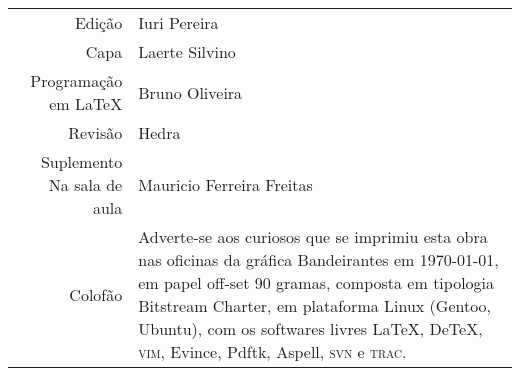 
\newcommand{\putline}[2]{#1 & #2\\}

%
\ifodd\thepage\paginabranca\else\clearpage\fi
\pagebreak
\thispagestyle{empty}

\noindent\begin{tabular}{rp{}}\small
    \putline{Edição}{Iuri Pereira}
		\putline{Capa}{Laerte Silvino}
		\putline{Programação em \LaTeX}{Bruno Oliveira}
		\putline{Revisão}{Hedra}
		\putline{Suplemento Na sala de aula}{Mauricio Ferreira Freitas}
		\putline{Colofão}{Adverte-se aos curiosos que se
			imprimiu esta obra nas oficinas da gráfica
			Bandeirantes em \today, em papel 
			\mbox{off-set} 90 gramas,
			composta em tipologia Bitstream Charter, 
			em plataforma Linux (Gentoo, Ubuntu), 
			com os softwares livres 
			\LaTeX, De\TeX, \textsc{vim}, Evince, Pdftk, 
			Aspell, \textsc{svn} e \textsc{trac}.}
\end{tabular}

